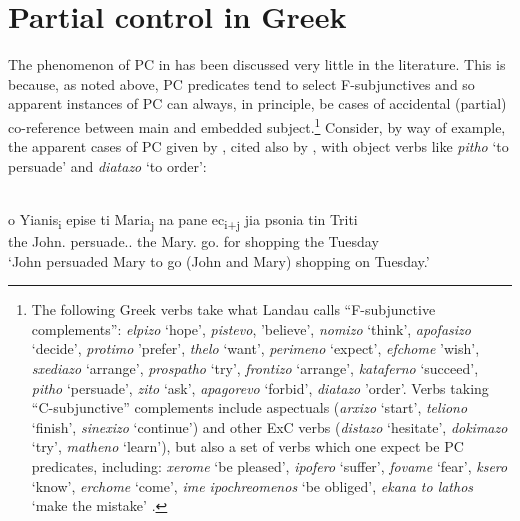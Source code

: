 \documentclass[output=paper]{langsci/langscibook}
\begin{document}
\section{Partial control in Greek}\label{sec:key:24.3}

The phenomenon of \gls{PC} in  has been
discussed very little in the literature. This is because, as noted above,
\gls{PC} predicates tend to select F-subjunctives
and so apparent instances of \gls{PC} can always, in
principle, be cases of accidental (partial) co-reference between main and
embedded subject.\footnote{The following Greek verbs take what Landau calls
    \enquote{F-subjunctive complements}: \emph{elpizo} `hope',
    \emph{pistevo}, 'believe', \emph{nomizo} `think', \emph{apofasizo}
    `decide', \emph{protimo} 'prefer', \emph{thelo} `want', \emph{perimeno}
    `expect', \emph{efchome} 'wish', \emph{sxediazo} `arrange',
    \emph{prospatho} `try', \emph{frontizo} `arrange', \emph{kataferno}
    `succeed', \emph{pitho} `persuade', \emph{zito} `ask', \emph{apagorevo}
    `forbid', \emph{diatazo} 'order'. Verbs taking \enquote{C-subjunctive}
    complements include aspectuals (\emph{arxizo} `start', \emph{teliono}
    `finish', \emph{sinexizo} `continue') and other
    \gls{ExC} verbs (\emph{distazo} `hesitate',
    \emph{dokimazo} `try', \emph{matheno} `learn'), but also a set of verbs
    which one expect be \gls{PC} predicates,
    including: \emph{xerome} `be pleased', \emph{ipofero} `suffer',
    \emph{fovame} `fear', \emph{ksero} `know', \emph{erchome} `come', \emph{ime
ipochreomenos} `be obliged', \emph{ekana to lathos} `make the mistake'
\parencite[Ch.\ 4]{Varlokosta1994}.\label{fn:24.4}} Consider, by way of
example, the apparent cases of \gls{PC} given by
\textcite{Spyropoulos2007b}, cited also by \textcite{Kapetangianni2010}, with
object  verbs like \emph{pitho} `to persuade' and \emph{diatazo} `to
order':

\ea%
    \label{ex:key:24.16}\\
	\gll o Yianis\textsubscript{i}       epise         ti Maria\textsubscript{j}       na     pane ec\textsubscript{i+j} jia psonia tin Triti\\
		the John.\Nom{}   persuade.\Tsg.\Pst{}    the Mary.\Acc{}    \Sbjv{} go.\Tpl{} {} for shopping the Tuesday\\
	\glt ‘John persuaded Mary to go (John and Mary) shopping on Tuesday.’
\z
\end{document}
